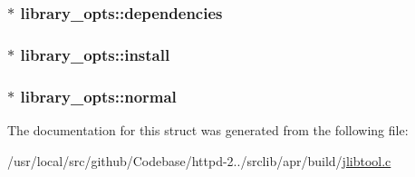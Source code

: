 \subsubsection[{\texorpdfstring{dependencies}{dependencies}}]{$\ast$ library\+\_\+opts\+::dependencies}\hypertarget{structlibrary__opts_a6c2bbecd5e4f75d14e7892eda54843c9}{}\label{structlibrary__opts_a6c2bbecd5e4f75d14e7892eda54843c9}
\subsubsection[{\texorpdfstring{install}{install}}]{$\ast$ library\+\_\+opts\+::install}\hypertarget{structlibrary__opts_acbd8063828e6e9688ab0bb8d84c2c2f1}{}\label{structlibrary__opts_acbd8063828e6e9688ab0bb8d84c2c2f1}
\subsubsection[{\texorpdfstring{normal}{normal}}]{$\ast$ library\+\_\+opts\+::normal}\hypertarget{structlibrary__opts_ad3503036347d561d385275741e4799fe}{}\label{structlibrary__opts_ad3503036347d561d385275741e4799fe}


The documentation for this struct was generated from the following file\+:\begin{DoxyCompactItemize}
\item 
/usr/local/src/github/\+Codebase/httpd-\/2../srclib/apr/build/\hyperlink{jlibtool_8c}{jlibtool.\+c}\end{DoxyCompactItemize}
